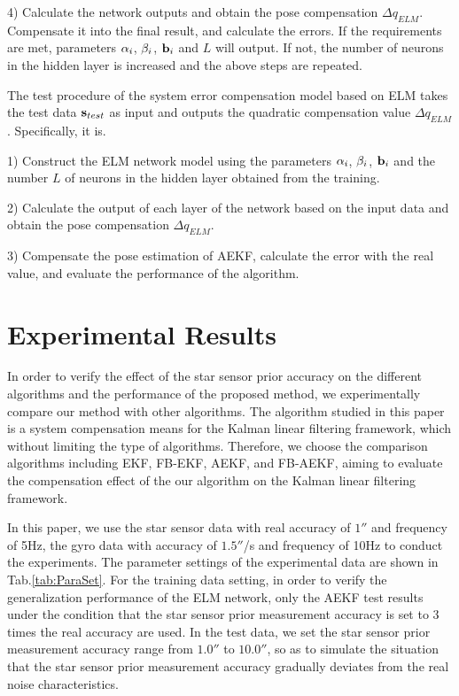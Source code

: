 \documentclass{article}
\begin{document}
	4) Calculate the network outputs and obtain the pose compensation $\Delta {q_{ELM}}$. Compensate it into the final result, and calculate the errors. If the requirements are met, parameters $ {{\bf{\alpha }}_i} $, $ {{\bf{\beta }}_i} $, $ {{\bf{b}}_i} $ and $ L $ will output. If not, the number of neurons in the hidden layer is increased and the above steps are repeated.
	
	The test procedure of the system error compensation model based on ELM takes the test data $ {{\bf{s}}_{test}} $ as input and outputs the quadratic compensation value $\Delta {q_{ELM}}$. Specifically, it is.
	
	1) Construct the ELM network model using the parameters $ {{\bf{\alpha }}_i} $, $ {{\bf{\beta }}_i} $, $ {{\bf{b}}_i} $ and the number $ L $ of neurons in the hidden layer obtained from the training.
	
	2) Calculate the output of each layer of the network based on the input data and obtain the pose compensation $\Delta {q_{ELM}}$.
	
	3) Compensate the pose estimation of AEKF, calculate the error with the real value, and evaluate the performance of the algorithm.
	
	\section{Experimental Results}
	\label{sec:experiment}
	In order to verify the effect of the star sensor prior accuracy on the different algorithms and the performance of the proposed method, we experimentally compare our method with other algorithms. The algorithm studied in this paper is a system compensation means for the Kalman linear filtering framework, which without limiting the type of algorithms. Therefore, we choose the comparison algorithms including EKF, FB-EKF, AEKF, and FB-AEKF, aiming to evaluate the compensation effect of the our algorithm on the Kalman linear filtering framework.
	
	In this paper, we use the star sensor data with real accuracy of $1''$ and frequency of 5Hz, the gyro data with accuracy of $ 1.5'' $/s and frequency of 10Hz to conduct the experiments. The parameter settings of the experimental data are shown in Tab.\ref{tab:ParaSet}. 
	For the training data setting, in order to verify the generalization performance of the ELM network, only the AEKF test results under the condition that the star sensor prior measurement accuracy is set to 3 times the real accuracy are used.
	In the test data, we set the star sensor prior measurement accuracy range from $ 1.0'' $ to $ 10.0''$, so as to simulate the situation that the star sensor prior measurement accuracy gradually deviates from the real noise characteristics.
	
\end{document}
